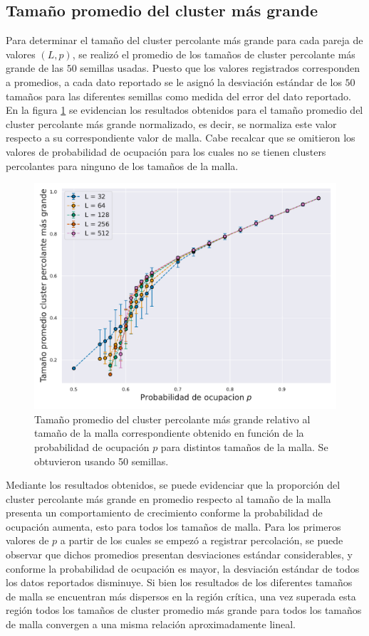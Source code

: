 \documentclass[%
 reprint,
 amsmath,amssymb,
 aps,
]{revtex4-2}
\begin{document}
\subsection{Tamaño promedio del cluster más grande}

Para determinar el tamaño del cluster percolante más grande para cada pareja de valores $(L, p)$, se realizó el promedio de los tamaños de cluster percolante más grande de las $50$ semillas usadas. Puesto que los valores registrados corresponden a promedios, a cada dato reportado se le asignó la desviación estándar de los $50$ tamaños para las diferentes semillas como medida del error del dato reportado. En la figura \ref{fig: tamano} se evidencian los resultados obtenidos para el tamaño promedio del cluster percolante más grande normalizado, es decir, se normaliza este valor respecto a su correspondiente valor de malla. Cabe recalcar que se omitieron los valores de probabilidad de ocupación para los cuales no se tienen clusters percolantes para ninguno de los tamaños de la malla.

\begin{figure}[H]
    \centering
    \includegraphics[width=1\linewidth]{Tamanocluster.pdf}
    \caption{Tamaño promedio del cluster percolante más grande relativo al tamaño de la malla correspondiente obtenido en función de la probabilidad de ocupación $p$ para distintos tamaños de la malla. Se obtuvieron usando 50 semillas.}
    \label{fig: tamano}
\end{figure}

Mediante los resultados obtenidos, se puede evidenciar que la proporción del cluster percolante más grande en promedio respecto al tamaño de la malla presenta un comportamiento de crecimiento conforme la probabilidad de ocupación aumenta, esto para todos los tamaños de malla. Para los primeros valores de $p$ a partir de los cuales se empezó a registrar percolación, se puede observar que dichos promedios presentan desviaciones estándar considerables, y conforme la probabilidad de ocupación es mayor, la desviación estándar de todos los datos reportados disminuye. Si bien los resultados de los diferentes tamaños de malla se encuentran más dispersos en la región crítica, una vez superada esta región todos los tamaños de cluster promedio más grande para todos los tamaños de malla convergen a una misma relación aproximadamente lineal. 
\end{document}
